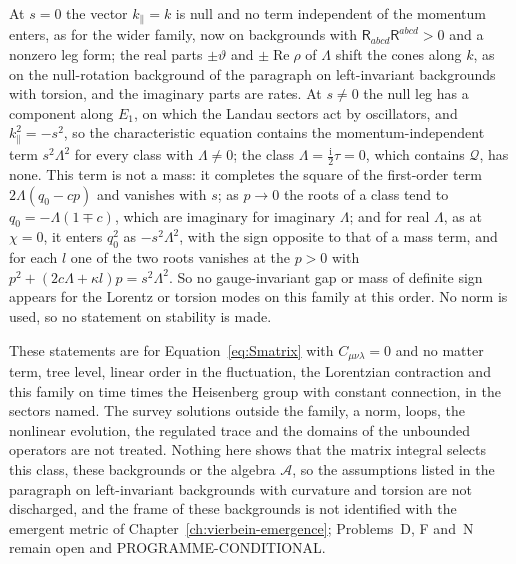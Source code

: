 At \(s=0\) the vector \(k_\parallel=k\) is null and no term independent of the momentum enters, as for the wider family, now on backgrounds with \(\mathsf R_{abcd}\mathsf R^{abcd}>0\) and a nonzero leg form; the real parts \(\pm\vartheta\) and \(\pm\operatorname{Re}\rho\) of \(\Lambda\) shift the cones along \(k\), as on the null-rotation background of the paragraph on left-invariant backgrounds with torsion, and the imaginary parts are rates. At \(s\neq0\) the null leg has a component along \(E_1\), on which the Landau sectors act by oscillators, and \(k_\parallel^2=-s^2\), so the characteristic equation contains the momentum-independent term \(s^2\Lambda^2\) for every class with \(\Lambda\neq0\); the class \(\Lambda=\tfrac{\mathrm i}2\tau=0\), which contains \(\mathcal Q\), has none. This term is not a mass: it completes the square of the first-order term \(2\Lambda(q_0-cp)\) and vanishes with \(s\); as \(p\to0\) the roots of a class tend to \(q_0=-\Lambda(1\mp c)\), which are imaginary for imaginary \(\Lambda\); and for real \(\Lambda\), as at \(\chi=0\), it enters \(q_0^2\) as \(-s^2\Lambda^2\), with the sign opposite to that of a mass term, and for each \(l\) one of the two roots vanishes at the \(p>0\) with \(p^2+(2c\Lambda+\kappa l)p=s^2\Lambda^2\). So no gauge-invariant gap or mass of definite sign appears for the Lorentz or torsion modes on this family at this order. No norm is used, so no statement on stability is made.

These statements are for Equation~\eqref{eq:Smatrix} with \(C_{\mu\nu\lambda}=0\) and no matter term, tree level, linear order in the fluctuation, the Lorentzian contraction and this family on time times the Heisenberg group with constant connection, in the sectors named. The survey solutions outside the family, a norm, loops, the nonlinear evolution, the regulated trace and the domains of the unbounded operators are not treated. Nothing here shows that the matrix integral selects this class, these backgrounds or the algebra \(\mathcal A\), so the assumptions listed in the paragraph on left-invariant backgrounds with curvature and torsion are not discharged, and the frame of these backgrounds is not identified with the emergent metric of Chapter~\ref{ch:vierbein-emergence}; Problems~D, F and~N remain open and PROGRAMME-CONDITIONAL.
